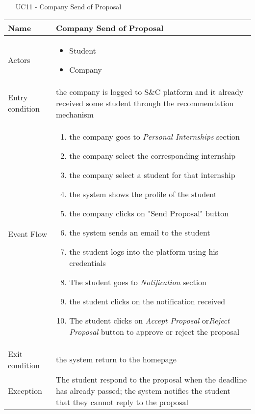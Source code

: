 				
			
				
				\begin{table} [H]
					\centering
						\begin{itemize}
						\item [UC11] - Company Send of Proposal
					\end{itemize}
					\begin{tabular}{|| P{7.5cm} | P{7.5cm} ||}
						\hline
						Name & Company Send of Proposal \\
						\hline
						Actors & \parbox{5cm}{\begin{itemize}
								\item Student
								\item Company
							\end{itemize}
						} \\
						\hline
						Entry condition & the company is logged to S\&C platform and it already received some student through the recommendation mechanism \\
						\hline
						Event Flow & \parbox{5cm}{\begin{enumerate}[label=\alpha]
								\item the company goes to \textit{Personal Internships} section
								\item the company select the corresponding internship 
								\item the company select a student for that internship
								\item the system shows the profile of the student
								\item the company clicks on "Send Proposal" button
								\item the system sends an email to the student
								\item the student logs into the platform using his credentials
								\item The student goes to \textit{Notification} 
								section 
								\item the student clicks on the notification 
								received 
								\item The student clicks on \textit{Accept 
									Proposal} or\textit{Reject Proposal}
								button to approve or reject the 
								proposal
						\end{enumerate}} \\
						\hline 
						Exit condition & the system return to the homepage \\
						\hline
						Exception & The student respond to the proposal when the deadline has already passed; the 
								system notifies the student that they 
								cannot reply to the proposal \\
						\hline
					\end{tabular}
				\end{table}
				
